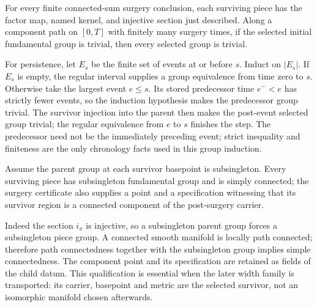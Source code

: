 \begin{proposition}
\label{prop:filling-group-effects}
For every finite connected-sum surgery conclusion, each surviving piece has
the factor map, named kernel, and injective section just described. Along a
component path on $[0,T]$ with finitely many surgery times, if the selected
initial fundamental group is trivial, then every selected group is trivial.
\end{proposition}

For persistence, let $E_s$ be the finite set of events at or before $s$. Induct
on $|E_s|$. If $E_s$ is empty, the regular interval supplies a group equivalence
from time zero to $s$. Otherwise take the largest event $e\leq s$. Its stored
predecessor time $e^-<e$ has strictly fewer events, so the induction
hypothesis makes the predecessor group trivial. The survivor injection into
the parent then makes the post-event selected group trivial; the regular
equivalence from $e$ to $s$ finishes the step. The predecessor need not be the
immediately preceding event; strict inequality and finiteness are the only
chronology facts used in this group induction.

\begin{proposition}
\label{prop:filling-child-components}
Assume the parent group at each survivor basepoint is subsingleton. Every
surviving piece has subsingleton fundamental group and is simply connected;
the surgery certificate also supplies a point and a specification witnessing
that its survivor region is a connected component of the post-surgery carrier.
\end{proposition}

Indeed the section $i_x$ is injective, so a subsingleton parent group forces a
subsingleton piece group. A connected smooth manifold is locally path
connected; therefore path connectedness together with the subsingleton group
implies simple connectedness. The component point and its specification are
retained as fields of the child datum. This qualification is essential when
the later width family is transported: its carrier, basepoint and metric are
the selected survivor, not an isomorphic manifold chosen afterwards.

